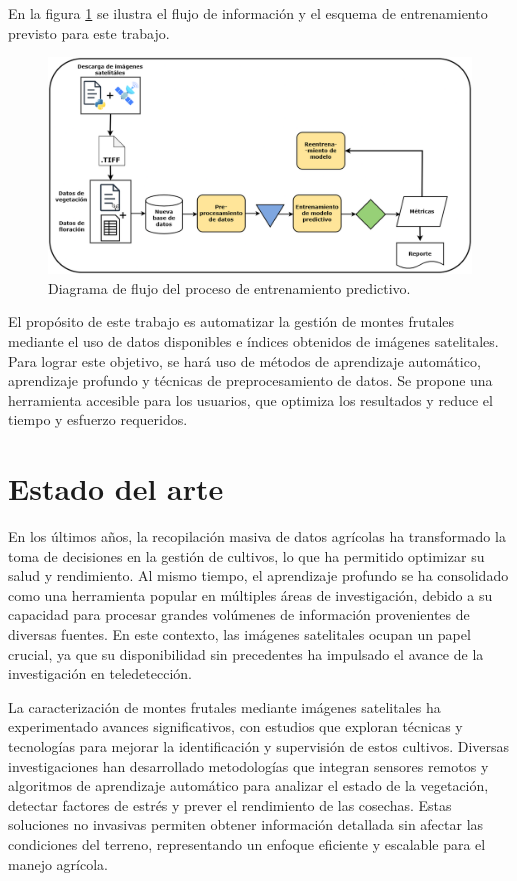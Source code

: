 En la figura \ref{fig:diagramatesis} se ilustra el flujo de información y el esquema de entrenamiento 
previsto para este trabajo.

\begin{figure}[h]
	\centering
	\includegraphics[width=\textwidth]{./Figures/flujo_tesis_tffa.png}
	\caption{Diagrama de flujo del proceso de entrenamiento predictivo.}
	\label{fig:diagramatesis}
\end{figure}


El propósito de este trabajo es automatizar la gestión de montes frutales mediante el 
uso de datos disponibles e índices obtenidos de imágenes satelitales. Para lograr este
objetivo, se hará uso de métodos de aprendizaje automático, aprendizaje profundo y 
técnicas de preprocesamiento de datos. Se propone una herramienta accesible para los 
usuarios, que optimiza los resultados y reduce el tiempo y esfuerzo requeridos.

\section{Estado del arte}

En los últimos años, la recopilación masiva de datos agrícolas ha transformado la 
toma de decisiones en la gestión de cultivos, lo que ha permitido optimizar su salud
y rendimiento. Al mismo tiempo, el aprendizaje profundo se ha consolidado como una
herramienta popular en múltiples áreas de investigación, debido a su capacidad para
procesar grandes volúmenes de información provenientes de diversas fuentes. En 
este contexto, las imágenes satelitales ocupan un papel crucial, ya que su 
disponibilidad sin precedentes ha impulsado el avance de la investigación en teledetección.

La caracterización de montes frutales mediante imágenes satelitales ha 
experimentado avances significativos, con estudios que exploran técnicas y
tecnologías para mejorar la identificación y supervisión de estos cultivos.
Diversas investigaciones han desarrollado metodologías que integran sensores 
remotos y algoritmos de aprendizaje automático para analizar el estado de la 
vegetación, detectar factores de estrés y prever el rendimiento de las cosechas. 
Estas soluciones no invasivas permiten obtener información detallada sin afectar
las condiciones del terreno, representando un enfoque eficiente y escalable 
para el manejo agrícola.

